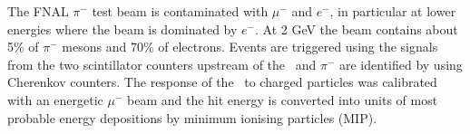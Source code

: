 The FNAL $\pi^-$ test beam is contaminated with $\mu^-$ and $e^-$, in particular at lower energies where the beam is dominated by $e^-$. 
At 2 GeV the beam contains about 5\% of $\pi^-$ mesons and 70\% of electrons. 
Events are triggered using the signals from the two scintillator counters upstream of the \ecal\ and $\pi^-$ are identified by using Cherenkov counters.
The response of the \ecal\ to charged particles was calibrated with  an energetic $\mu^-$ beam \cite{li:tel-00430432} and the hit energy is converted into units of most probable energy depositions by minimum ionising particles (MIP). 

